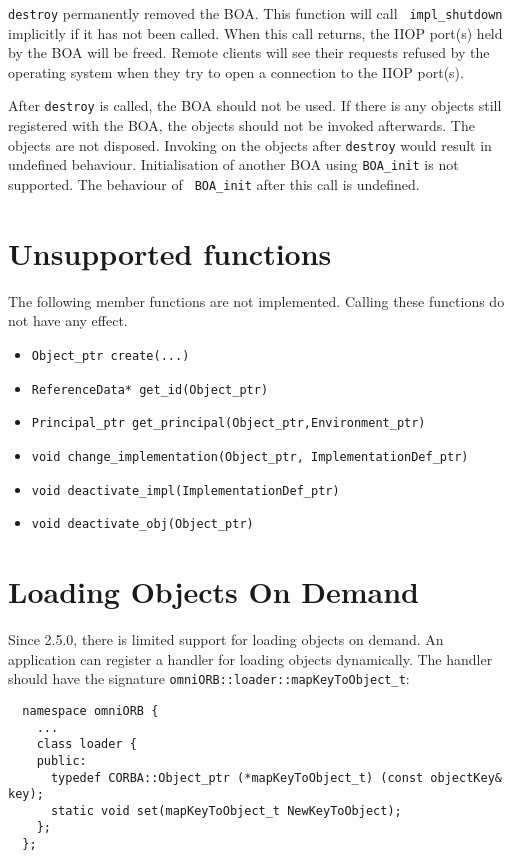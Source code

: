 \documentclass[11pt,twoside,onecolumn]{book}
\begin{document}
{\tt destroy} permanently removed the BOA. This function will call {\tt
impl\_shutdown} implicitly if it has not been called. When this call
returns, the IIOP port(s) held by the BOA will be freed. Remote clients
will see their requests refused by the operating system when they try to
open a connection to the IIOP port(s). 

After {\tt destroy} is called, the BOA should not be used. If there is any
objects still registered with the BOA, the objects should not be invoked
afterwards. The objects are not disposed. Invoking on the objects after
{\tt destroy} would result in undefined behaviour. Initialisation of
another BOA using {\tt BOA\_init} is not supported. The behaviour of {\tt
BOA\_init} after this call is undefined.

\section{Unsupported functions}

The following member functions are not implemented. Calling these functions
do not have any effect.

\begin{itemize}
\item {\tt Object\_ptr create(...)}
\item {\tt ReferenceData* get\_id(Object\_ptr)}
\item {\tt Principal\_ptr get\_principal(Object\_ptr,Environment\_ptr)}
\item {\tt void change\_implementation(Object\_ptr, ImplementationDef\_ptr)}
\item {\tt void deactivate\_impl(ImplementationDef\_ptr)}
\item {\tt void deactivate\_obj(Object\_ptr)}
\end{itemize}


\section{Loading Objects On Demand}

Since 2.5.0, there is limited support for loading objects on demand. 
An application can register a handler for loading objects dynamically. The
handler should have the signature {\tt omniORB::loader::mapKeyToObject\_t}:

{\small
\begin{verbatim}
  namespace omniORB {
    ...
    class loader {
    public:
      typedef CORBA::Object_ptr (*mapKeyToObject_t) (const objectKey& key);
      static void set(mapKeyToObject_t NewKeyToObject);
    };
  };
\end{verbatim}
}
\end{document}
